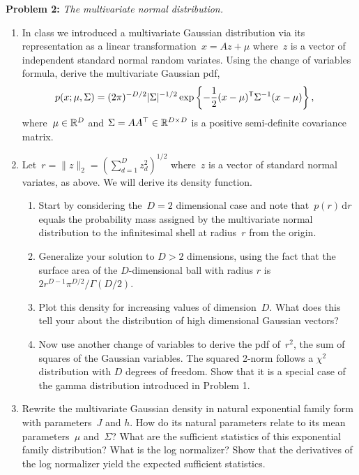 \documentclass[11pt]{article}
\begin{document}
\clearpage


\textbf{Problem 2:}  \textit{The multivariate normal distribution.} 

\begin{enumerate}[label=(\alph*)]

\item In class we introduced a multivariate Gaussian distribution via its representation as a linear transformation~$x = Az + \mu$ where~$z$ is a vector of independent standard normal random variates.  Using the change of variables formula, derive the multivariate Gaussian pdf,
\begin{align*}
    p(x; \mu, \Sigma) &= (2 \pi)^{-D/2} |\Sigma|^{-1/2} \exp \left\{ -\frac{1}{2} (x - \mu)^{\mathsf{T}} \Sigma^{-1} (x- \mu) \right\},
\end{align*}
where~$\mu \in \mathbb{R}^D$ and $\Sigma = AA^\top \in \mathbb{R}^{D \times D}$ is a positive semi-definite covariance matrix.

\item Let~$r = \|z\|_2 = (\sum_{d=1}^D z_d^2)^{1/2}$ where~$z$ is a vector of standard normal variates, as above.  We will derive its density function. 
\begin{enumerate}[label=(\roman*)]
    \item Start by considering the~$D=2$ dimensional case and note that~$p(r) \, \mathrm{d}r$ equals the probability mass assigned by the multivariate normal distribution to the infinitesimal shell at radius~$r$ from the origin.  
    
    \item Generalize your solution to $D > 2$ dimensions, using the fact that the surface area of the $D$-dimensional ball with radius $r$ is $2r^{D-1} \pi^{D/2} / \Gamma(D/2)$.
    
    \item Plot this density for increasing values of dimension~$D$. What does this tell your about the distribution of high dimensional Gaussian vectors?  
    \item Now use another change of variables to derive the pdf of~$r^2$, the sum of squares of the Gaussian variables. The squared 2-norm follows a $\chi^2$ distribution with $D$ degrees of freedom. Show that it is a special case of the gamma distribution introduced in Problem 1.
    
\end{enumerate}


\item Rewrite the multivariate Gaussian density in natural exponential family form with parameters~$J$ and $h$.  How do its natural parameters relate to its mean parameters~$\mu$ and~$\Sigma$? What are the sufficient statistics of this exponential family distribution?  What is the log normalizer?  Show that the derivatives of the log normalizer yield the expected sufficient statistics. 


\end{enumerate}
\end{document}

